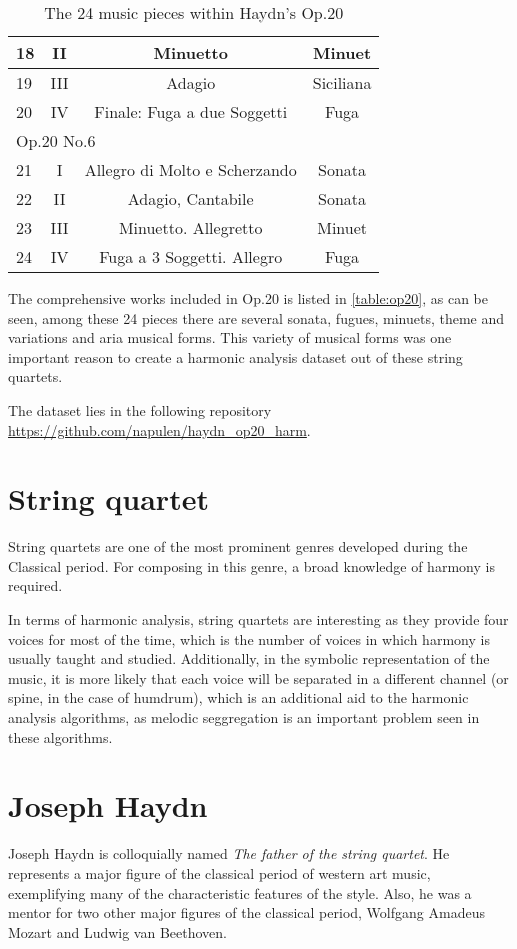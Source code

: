 \begin{table}[]
\begin{tabular}{|l|c|c|c|}
18 & II & Minuetto & Minuet \\ \hline
19 & III & Adagio & Siciliana \\ \hline
20 & IV & Finale: Fuga a due Soggetti & Fuga \\ \hline
\multicolumn{4}{|l|}{Op.20 No.6} \\ \hline
21 & I & Allegro di Molto e Scherzando & Sonata \\ \hline
22 & II & Adagio, Cantabile & Sonata \\ \hline
23 & III & Minuetto. Allegretto & Minuet \\ \hline
24 & IV & Fuga a 3 Soggetti. Allegro & Fuga \\ \hline
\end{tabular}
\caption{The 24 music pieces within Haydn's Op.20}
\label{table:op20}
\end{table}

The comprehensive works included in Op.20 is listed in \autoref{table:op20}, as can be seen, among these 24 pieces there are several sonata, fugues, minuets, theme and variations and aria musical forms. This variety of musical forms was one important reason to create a harmonic analysis dataset out of these string quartets.

The dataset lies in the following repository \url{https://github.com/napulen/haydn_op20_harm}.

\section{String quartet}
String quartets are one of the most prominent genres developed during the Classical period. For composing in this genre, a broad knowledge of harmony is required.

In terms of harmonic analysis, string quartets are interesting as they provide four voices for most of the time, which is the number of voices in which harmony is usually taught and studied. Additionally, in the symbolic representation of the music, it is more likely that each voice will be separated in a different channel (or spine, in the case of humdrum), which is an additional aid to the harmonic analysis algorithms, as melodic seggregation is an important problem seen in these algorithms.

\section{Joseph Haydn}
Joseph Haydn is colloquially named \emph{The father of the string quartet}. He represents a major figure of the classical period of western art music,
exemplifying many of the characteristic features of the style. Also, he was a mentor for two other major figures of the classical period, Wolfgang Amadeus Mozart and Ludwig van Beethoven.

